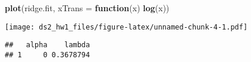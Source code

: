 \documentclass[]{article}
\newenvironment{Shaded}{\begin{snugshade}}{\end{snugshade}}
\newcommand{\CommentTok}[1]{\textcolor[rgb]{0.56,0.35,0.01}{\textit{#1}}}
\newcommand{\ControlFlowTok}[1]{\textcolor[rgb]{0.13,0.29,0.53}{\textbf{#1}}}
\newcommand{\DataTypeTok}[1]{\textcolor[rgb]{0.13,0.29,0.53}{#1}}
\newcommand{\KeywordTok}[1]{\textcolor[rgb]{0.13,0.29,0.53}{\textbf{#1}}}
\newcommand{\NormalTok}[1]{#1}
\newcommand{\OperatorTok}[1]{\textcolor[rgb]{0.81,0.36,0.00}{\textbf{#1}}}
\begin{document}
\begin{Shaded}
\begin{Highlighting}[]
\KeywordTok{plot}\NormalTok{(ridge.fit, }\DataTypeTok{xTrans =} \ControlFlowTok{function}\NormalTok{(x) }\KeywordTok{log}\NormalTok{(x))}
\end{Highlighting}
\end{Shaded}

\texttt{[image: ds2\_hw1\_files/figure-latex/unnamed-chunk-4-1.pdf]}

\begin{Shaded}
\end{Shaded}

\begin{verbatim}
##   alpha    lambda
## 1     0 0.3678794
\end{verbatim}

\begin{Shaded}
\end{Shaded}
\end{document}
